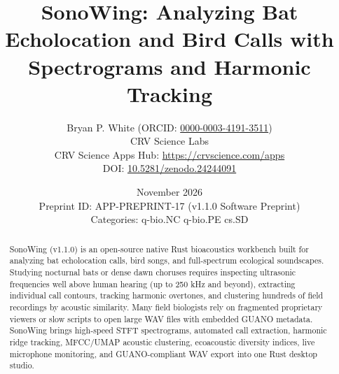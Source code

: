 \documentclass[10pt,letterpaper]{article}
\title{\textbf{SonoWing: Analyzing Bat Echolocation and Bird Calls with Spectrograms and Harmonic Tracking}}
\author{Bryan P. White (ORCID: \href{https://orcid.org/0000-0003-4191-3511}{0000-0003-4191-3511}) \\ CRV Science Labs \\ \small CRV Science Apps Hub: \url{https://crvscience.com/apps} \\ \small DOI: \href{https://doi.org/10.5281/zenodo.24244091}{10.5281/zenodo.24244091}}
\date{November 2026 \\ \small Preprint ID: APP-PREPRINT-17 (v1.1.0 Software Preprint) \\ \small Categories: q-bio.NC \textbullet{} q-bio.PE \textbullet{} cs.SD}
\begin{document}
\maketitle

\begin{abstract}
SonoWing (v1.1.0) is an open-source native Rust bioacoustics workbench built for analyzing bat echolocation calls, bird songs, and full-spectrum ecological soundscapes. Studying nocturnal bats or dense dawn choruses requires inspecting ultrasonic frequencies well above human hearing (up to 250 kHz and beyond), extracting individual call contours, tracking harmonic overtones, and clustering hundreds of field recordings by acoustic similarity. Many field biologists rely on fragmented proprietary viewers or slow scripts to open large WAV files with embedded GUANO metadata. SonoWing brings high-speed STFT spectrograms, automated call extraction, harmonic ridge tracking, MFCC/UMAP acoustic clustering, ecoacoustic diversity indices, live microphone monitoring, and GUANO-compliant WAV export into one Rust desktop studio.
\end{abstract}
\end{document}

